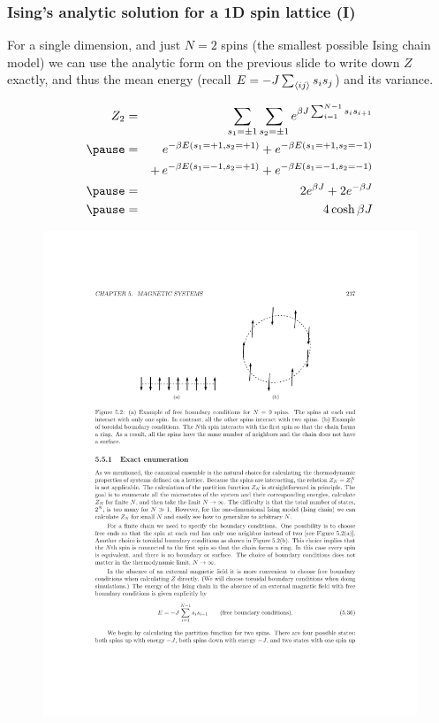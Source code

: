 \documentclass[hyperref={colorlinks=true}]{beamer}
\begin{document}
\begin{frame}%
  \frametitle{Ising's analytic solution for a 1D spin lattice (I)}


    For a single dimension, and just $N=2$ spins (the smallest possible Ising chain model) we can use the analytic form on the previous slide to write down $Z$ exactly, and thus the mean energy (recall $E=-J\sum_{\langle ij \rangle}s_{i} s_{j}$) and its variance. \pause

  \begin{eqnarray}
    Z_2 &=& \sum_{s_1 = \pm1} \sum_{s_2 = \pm1} e^{ \beta J\sum_{i=1}^{N-1} s_i s_{i+1} }  \\ \pause
        &=& e^{ -\beta E(s_1 = +1, s_2 =+1) } + e^{ -\beta E(s_1 = +1, s_2 =-1) } \nonumber  \\ 
        & & +\, e^{ -\beta E(s_1 = -1, s_2 =+1) } + e^{ -\beta E(s_1 = -1, s_2 =-1) }  \\ \pause
        &=& 2 e^{ \beta J } + 2 e^{ -\beta J }  \\ \pause
        &=& 4 \cosh \beta J
  \end{eqnarray}

  \begin{figure}
    \centering
    \includegraphics[width=\textwidth]{../Lecture5/Ising-spins-1D.pdf}
  \end{figure}

\end{frame}
\end{document}
